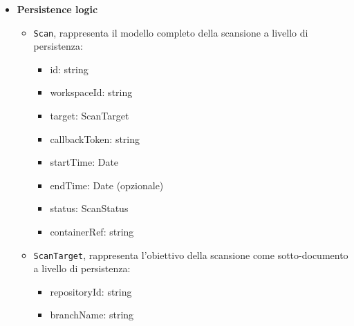 \documentclass[a4paper, 11pt]{article}
\newcounter{subsubsubsection}[subsubsection]
\newcounter{subsubsubsubsection}[subsubsubsection]
\begin{document}
\begin{itemize}
  \item \textbf{Persistence logic}
      \begin{itemize}
          \item \texttt{Scan}, rappresenta il modello completo della scansione a livello di persistenza:
          \begin{itemize}
                \item id: string
                \item workspaceId: string
                \item target: ScanTarget
                \item callbackToken: string
                \item startTime: Date
                \item endTime: Date (opzionale)
            \item status: ScanStatus
            \item containerRef: string
            \end{itemize}
      \item \texttt{ScanTarget}, rappresenta l'obiettivo della scansione come sotto-documento a livello di persistenza:
          \begin{itemize}
                \item repositoryId: string
                \item branchName: string
            \end{itemize}
      \end{itemize}
\end{itemize}

\end{document}
